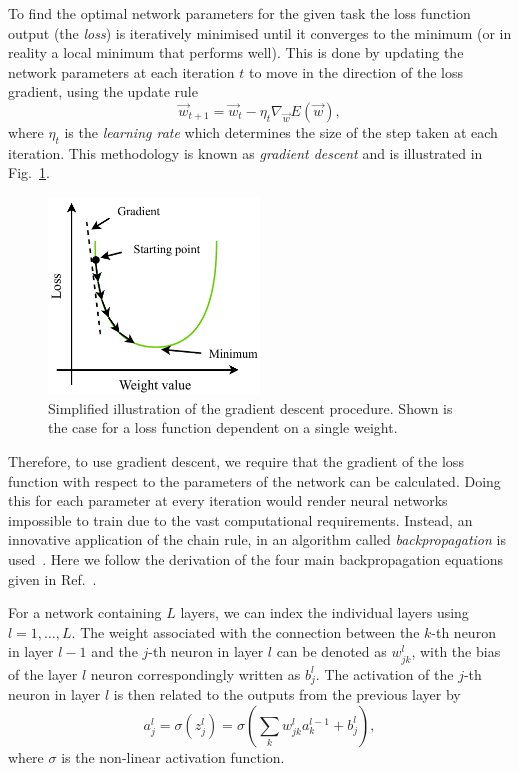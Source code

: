 To find the optimal network parameters for the given task the loss function output (the
\emph{loss}) is iteratively minimised until it converges to the minimum (or in reality a local
minimum that performs well). This is done by updating the network parameters at each iteration $t$
to move in the direction of the loss gradient, using the update rule
\begin{equation} %
    \vec{w}_{t+1}=\vec{w}_{t}-\eta_{t}\nabla_{\vec{w}}E(\vec{w}),
    \label{eq:update_rule}
\end{equation}
where $\eta_{t}$ is the \emph{learning rate} which determines the size of the step taken at each
iteration. This methodology is known as \emph{gradient descent} and is illustrated in
Fig.~\ref{fig:gradient_descent}.

\begin{figure} %
    \includegraphics[width=0.5\textwidth]{diagrams/6-cnn/gradient_descent.pdf}
    \caption[Illustration of the gradient descent process]
    {Simplified illustration of the gradient descent procedure. Shown is the case for a loss
        function dependent on a single weight.}
    \label{fig:gradient_descent}
\end{figure}

Therefore, to use gradient descent, we require that the gradient of the loss function with respect
to the parameters of the network can be calculated. Doing this for each parameter at every
iteration would render neural networks impossible to train due to the vast computational
requirements. Instead, an innovative application of the chain rule, in an algorithm called
\emph{backpropagation} is used~\cite{werbos1974}. Here we follow the derivation of the four main
backpropagation equations given in Ref.~\cite{mehta2019}.

For a network containing $L$ layers, we can index the individual layers using $l=1,\dots,L$. The
weight associated with the connection between the $k$-th neuron in layer $l-1$ and the $j$-th
neuron in layer $l$ can be denoted as $w^{l}_{jk}$, with the bias of the layer $l$ neuron
correspondingly written as $b^{l}_{j}$. The activation of the $j$-th neuron in layer $l$ is then
related to the outputs from the previous layer by
\begin{equation} %
    a^{l}_{j}=\sigma(z^{l}_{j})=\sigma\left(\sum_{k}w^{l}_{jk}a^{l-1}_{k}+b^{l}_{j}\right),
    \label{eq:feedforward}
\end{equation}
where $\sigma$ is the non-linear activation function.

